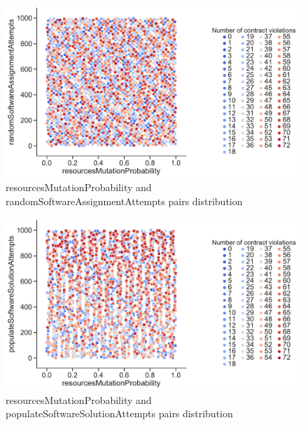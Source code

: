 \begin{figure}
	\centering
	\includegraphics[width=\textwidth]{images/PairsDistr/resourcesMutationProbability_randomSoftwareAssignmentAttempts.pdf}
	\caption[resourcesMutationProbability and randomSoftwareAssignmentAttempts pairs distribution]{resourcesMutationProbability and randomSoftwareAssignmentAttempts pairs distribution}
	\label{fig:resourcesMutationProbability_randomSoftwareAssignmentAttempts_pair}
\end{figure}
\begin{figure}
	\centering
	\includegraphics[width=\textwidth]{images/PairsDistr/resourcesMutationProbability_populateSoftwareSolutionAttempts.pdf}
	\caption[resourcesMutationProbability and populateSoftwareSolutionAttempts pairs distribution]{resourcesMutationProbability and populateSoftwareSolutionAttempts pairs distribution}
	\label{fig:resourcesMutationProbability_populateSoftwareSolutionAttempts_pair}
\end{figure}

